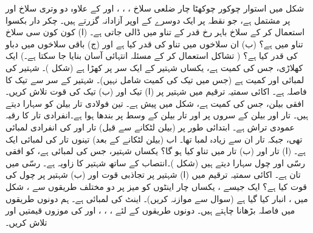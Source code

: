 شکل  میں استوار  چوکور  چوکھٹا  چار ضلعی سلاخ ، ، ، اور  کے علاوہ دو وتری سلاخ  اور  پر مشتمل ہے، جو   نقطہ  پر ایک دوسرے  کے اوپر  آزادانہ گزرتے ہیں۔ چکر دار بکسوا  استعمال کر کے سلاخ    باہر رخ   قدر کے تناو  میں ڈالی جاتی ہے۔ (ا)  کون کون سی سلاخ تناو میں ہے؟ (ب)  ان سلاخوں میں تناو کی قدر کیا ہے اور (ج)  باقی سلاخوں میں  دباو کی قدر کیا ہے؟ ( تشاکل استعمال کر کے مسئلہ انتہائی آسان بنایا جا سکتا ہے۔)
ایک کھلاڑی، جس کی کمیت  ہے، یکساں  شہتیر کے ایک سر پر کھڑا ہے (شکل )۔ شہتیر کی
 لمبائی  اور کمیت  ہے (جس میں  تیک کی کمیت شامل نہیں)۔ شہتیر کے سر سے تیک کا فاصلہ  ہے۔  اکائی سمتیہ ترقیم میں  شہتیر پر (ا) تیک  اور (ب) تیک  کی قوت تلاش کریں۔
افقی  بیلن، جس کی کمیت  ہے، شکل  میں پیش ہے۔ تین فولادی تار  بیلن کو سہارا دیتے ہیں۔ تار  اور   بیلن کے سروں پر   اور تار  بیلن کے وسط پر بندھا ہوا ہے۔انفرادی تار کا رقبہ عمودی تراش  ہے۔ ابتدائی طور پر (بیلن لٹکانے سے قبل) تار  اور  کی  انفرادی  لمبائی   تھی، جبکہ تار  ان سے  زیادہ لمبا تھا۔ اب (بیلن لٹکانے کے بعد) تینوں تار کی لمبائی ایک ہے۔ (ا) تار  اور (ب) تار  میں تناو کیا ہو گا؟
یکساں شہتیر، جس کی لمبائی  ہے، کو افقی رسّی اور چول سہارا دیتے ہیں (شکل )۔انتصاب کے ساتھ شہتیر کا زاویہ  ہے۔ رسّی میں تان   ہے۔ اکائی سمتیہ ترقیم میں (ا) شہتیر پر تجاذبی قوت  اور (ب)  شہتیر پر چول کی قوت کیا ہے؟
ایک جیسے ،  یکساں  چار اینٹوں کو میز پر دو مختلف طریقوں سے  ، شکل   میں  ، انبار کیا  گیا ہے (سوال  سے موازنہ کریں)۔ اینٹ کی لمبائی  ہے۔ ہم  دونوں طریقوں میں فاصلہ  بڑھانا چاہتے ہیں۔ دونوں طریقوں کے لئے ، ، ، اور  کی  موزوں قیمتیں   اور   تلاش کریں۔
